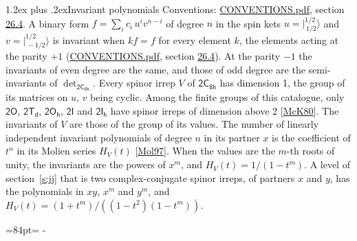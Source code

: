 \documentclass[10pt,a4paper]{article}
\makeatletter
\renewcommand\section{\@startsection{section}{1}{\z@}{-3ex plus -1ex minus -.2ex}%
  {1.2ex plus .2ex}{\normalfont\large\sffamily\bfseries\color{parttitle}}}
\newcommand{\needspace}[1]{\par\penalty-100\begingroup\dimen0=#1\relax\dimen2=\pagegoal
  \advance\dimen2-\pagetotal\ifdim\dimen0>\dimen2\relax\ifdim\dimen2>0pt\vfil\break\fi\fi
  \endgroup}
\numberwithin{equation}{section}
\newcommand{\grp}[1]{\mathsf{#1}}
\newcommand{\jm}[2]{\bigl\lvert{}^{#1}_{\,#2}\bigr\rangle}
\makeatother
\begin{document}
\section{Invariant polynomials}\label{s:invariants}
Conventions: \href{../../CONVENTIONS.pdf}{CONVENTIONS.pdf}, section \href{../../CONVENTIONS.pdf\#conv.26.4}{26.4}.
\leavevmode\label{n:local.binary.form}A binary form $f = \sum_i c_i\, u^i v^{n-i}$ of degree $n$ in the spin kets $u = \jm{1/2}{1/2}$ and $v = \jm{1/2}{-1/2}$ is invariant when $k f = f$ for every element $k$, the elements acting at the parity $+1$ (\href{../../CONVENTIONS.pdf}{CONVENTIONS.pdf}, section \href{../../CONVENTIONS.pdf\#conv.26.4}{26.4}). At the parity $-1$ the invariants of even degree are the same, and those of odd degree are the semi-invariants of $\det_{\grp{2C_{8h}}}$.
\leavevmode\label{n:function.hilbert}Every spinor irrep $V$ of $\grp{2C_{8h}}$ has dimension 1, the group of its matrices on $u$, $v$ being cyclic. Among the finite groups of this catalogue, only $\grp{2O}$, $\grp{2T_{d}}$, $\grp{2O_{h}}$, $\grp{2I}$ and $\grp{2I_{h}}$ have spinor irreps of dimension above 2 [\href{../../../REFERENCES.pdf\#ref.McK80}{McK80}]. The invariants of $V$ are those of the group of its values. \label{n:local.partner.x}The number of linearly independent invariant polynomials of degree $n$ in its partner $x$ is the coefficient of $t^n$ in its Molien series $H_V(t)$ [\href{../../../REFERENCES.pdf\#ref.Mol97}{Mol97}]. When the values are the $m$-th roots of unity, the invariants are the powers of $x^{m}$, and $H_V(t) = 1/(1 - t^{m})$. A level of section~\ref{s:jj} that is two complex-conjugate spinor irreps, of partners $x$ and $y$, has the polynomials in $xy$, $x^{m}$ and $y^{m}$, and $H_V(t) = (1 + t^{m})/((1 - t^{2})(1 - t^{m}))$.
\needspace{84pt}
\end{document}
